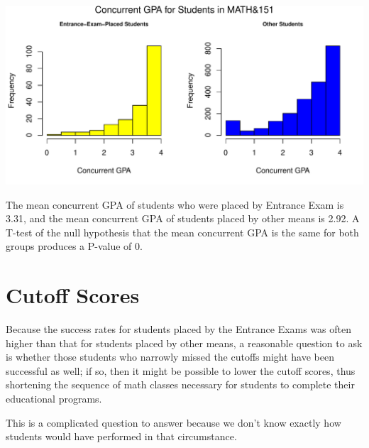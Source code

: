 \documentclass[twoside]{article}\usepackage[]{graphicx}\usepackage[]{color}
\makeatletter
\def\maxwidth{ %
  \ifdim\Gin@nat@width>\linewidth
    \linewidth
  \else
    \Gin@nat@width
  \fi
}
\newenvironment{knitrout}{}{} %
\makeatother
\begin{document}
\begin{knitrout}
\color{fgcolor}
\includegraphics[width=\maxwidth]{figure/GPAgraphs151-1} 

\end{knitrout}

The mean concurrent GPA of students who were placed by Entrance Exam is 3.31, and the mean concurrent GPA of students placed by other means is 2.92.  A T-test of the null hypothesis that the mean concurrent GPA is the same for both groups produces a P-value of 0.




\section{Cutoff Scores}


Because the success rates for students placed by the Entrance Exams was often higher than that for students placed by other means, a reasonable question to ask is whether those students who narrowly missed the cutoffs might have been successful as well; if so, then it might be possible to lower the cutoff scores, thus shortening the sequence of math classes necessary for students to complete their educational programs.

This is a complicated question to answer because we don't know exactly how students would have performed in that circumstance.  

\end{document}
